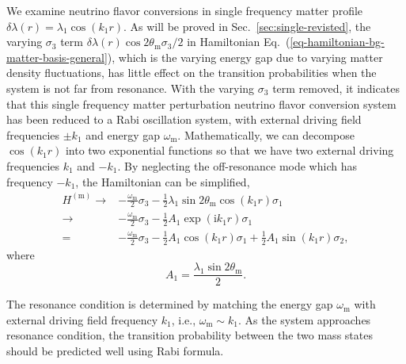 \documentclass[%
reprint,
 amsmath,amssymb,
 prd,
]{revtex4-1}
\begin{document}
We examine neutrino flavor conversions in single frequency matter profile $\delta\lambda(r) = \lambda_1 \cos(k_1 r)$. As will be proved in Sec.~\ref{sec:single-revisted}, the varying $\sigma_3$ term $\delta\lambda(r) \cos 2\theta_{\mathrm m} \sigma_3/2$ in Hamiltonian Eq.~(\ref{eq-hamiltonian-bg-matter-basis-general}), which is the varying energy gap due to varying matter density fluctuations, has little effect on the transition probabilities when the system is not far from resonance. With the
varying $\sigma_3$ term removed, it indicates that this single frequency matter perturbation neutrino flavor conversion system has been reduced to a Rabi oscillation system, with external driving field frequencies $\pm k_1$ and energy gap $\omega_{\mathrm m}$. Mathematically, we can decompose $\cos( k_1 r )$ into two exponential functions so that we have two external driving frequencies $k_1$ and $-k_1$. By neglecting the off-resonance mode which has frequency $-k_1$, the Hamiltonian can be simplified,
\begin{align}
H^{(\mathrm{m})} \to & -\frac{\omega_{\mathrm m}}{2} \sigma_3  - \frac{1}{2} \lambda_1 \sin 2\theta_{\mathrm m} \cos( k_1 r ) \sigma_1\label{eq-hamiltonian-bg-matter-basis-single-frequency} \\
\to & -\frac{\omega_{\mathrm m}}{2} \sigma_3  - \frac{1}{2} A_1 \exp (\mathrm ik_1 r) \sigma_1 \nonumber \\
= & -\frac{\omega_{\mathrm m}}{2} \sigma_3  - \frac{1}{2} A_1 \cos ( k_1 r)  \sigma_1 + \frac{1}{2} A_1\sin(k_1 r) \sigma_2,\nonumber
\end{align}
where
\begin{equation}
A_1 = \frac{\lambda_1 \sin 2\theta_{\mathrm m} }{2}.
\label{eq-define-a1}
\end{equation}

The resonance condition is determined by matching the energy gap $\omega_{\mathrm m}$ with external driving field frequency $k_1$, i.e., $\omega_{\mathrm m} \sim k_1$. As the system approaches resonance condition, the transition probability between the two mass states should be predicted well using Rabi formula.
\end{document}
